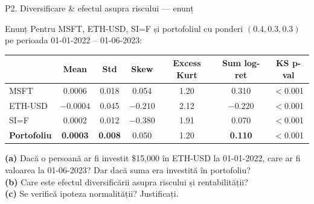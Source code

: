 \documentclass[9pt, aspectratio=169, t]{beamer}
\begin{document}
\begin{frame}{P2. Diversificare \& efectul asupra riscului --- enunț}
\begin{block}{Enunț}
Pentru MSFT, ETH-USD, SI=F și portofoliul cu ponderi $(0.4, 0.3, 0.3)$ pe perioada 01-01-2022 -- 01-06-2023:
\begin{center}\small
\begin{tabular}{lcccccc}\toprule
 & Mean & Std & Skew & Excess Kurt & Sum log-ret & KS p-val\\\midrule
MSFT     & 0.0006 & 0.018 & 0.054 & 1.20 & 0.310 & $<$0.001\\
ETH-USD  & $-0.0004$ & 0.045 & $-0.210$ & 2.12 & $-0.220$ & $<$0.001\\
SI=F     & 0.0002 & 0.012 & $-0.380$ & 1.91 & 0.070 & $<$0.001\\
\textbf{Portofoliu} & \textbf{0.0003} & \textbf{0.008} & 0.050 & 1.20 & \textbf{0.110} & $<$0.001\\\bottomrule
\end{tabular}
\end{center}
\textbf{(a)} Dacă o persoană ar fi investit \$15{,}000 în ETH-USD la 01-01-2022, care ar fi valoarea la 01-06-2023? Dar dacă suma era investită în portofoliu?\\
\textbf{(b)} Care este efectul diversificării asupra riscului și rentabilității?\\
\textbf{(c)} Se verifică ipoteza normalității? Justificați.
\end{block}
\end{frame}
\end{document}
